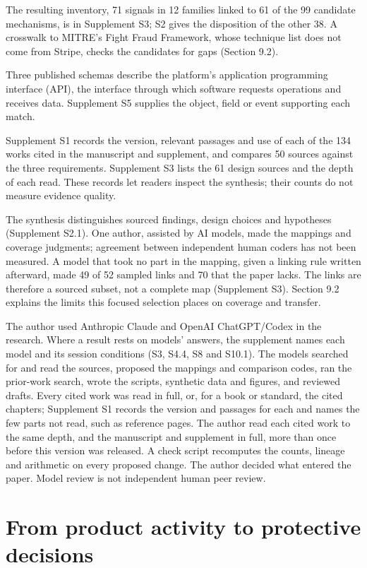 \documentclass[acmlarge,review,anonymous,nonacm]{acmart}
\begin{document}
The resulting inventory, 71 signals in 12 families linked to 61 of the
99 candidate mechanisms, is in Supplement S3; S2 gives the disposition
of the other 38. A crosswalk to MITRE's Fight Fraud Framework, whose
technique list does not come from Stripe, checks the candidates for gaps
(Section 9.2).

Three published schemas describe the platform's application programming
interface (API), the interface through which software requests
operations and receives data. Supplement S5 supplies the object, field
or event supporting each match.

Supplement S1 records the version, relevant passages and use of each of
the 134 works cited in the manuscript and supplement, and compares 50
sources against the three requirements. Supplement S3 lists the 61
design sources and the depth of each read. These records let readers
inspect the synthesis; their counts do not measure evidence quality.

The synthesis distinguishes sourced findings, design choices and
hypotheses (Supplement S2.1). One author, assisted by AI models, made
the mappings and coverage judgments; agreement between independent human
coders has not been measured. A model that took no part in the mapping,
given a linking rule written afterward, made 49 of 52 sampled links and
70 that the paper lacks. The links are therefore a sourced subset, not a
complete map (Supplement S3). Section 9.2 explains the limits this
focused selection places on coverage and transfer.

The author used Anthropic Claude and OpenAI ChatGPT/Codex in the
research. Where a result rests on models' answers, the supplement names
each model and its session conditions (S3, S4.4, S8 and S10.1). The
models searched for and read the sources, proposed the mappings and
comparison codes, ran the prior-work search, wrote the scripts,
synthetic data and figures, and reviewed drafts. Every cited work was
read in full, or, for a book or standard, the cited chapters; Supplement
S1 records the version and passages for each and names the few parts not
read, such as reference pages. The author read each cited work to the
same depth, and the manuscript and supplement in full, more than once
before this version was released. A check script recomputes the counts,
lineage and arithmetic on every proposed change. The author decided what
entered the paper. Model review is not independent human peer review.

\hypertarget{from-product-activity-to-protective-decisions}{%
\section{From product activity to protective
decisions}\label{from-product-activity-to-protective-decisions}}
\end{document}
